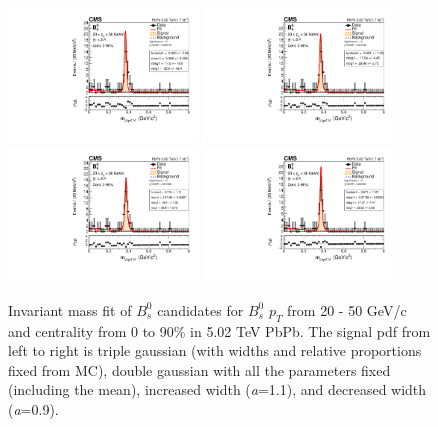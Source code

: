\begin{figure}[hbtp]
\begin{center}
\includegraphics[width=0.45\textwidth]{Figures/Chapter5/data_PbPb_1_BptNew_2050_doubly0_0_90_signal_3gaussEffInfoTreeFit.pdf}
\includegraphics[width=0.45\textwidth]{Figures/Chapter5/data_PbPb_1_BptNew_2050_doubly0_0_90_signal_fixedEffInfoTreeFit.pdf}
\includegraphics[width=0.45\textwidth]{Figures/Chapter5/data_PbPb_1_BptNew_2050_doubly0_0_90_signal_scal+EffInfoTreeFit.pdf}
\includegraphics[width=0.45\textwidth]{Figures/Chapter5/data_PbPb_1_BptNew_2050_doubly0_0_90_signal_scal-EffInfoTreeFit.pdf}
\caption{Invariant mass fit of $B^0_s$ candidates for $B^0_s$ $p_T$ from 20 - 50 GeV/c and centrality from 0 to 90\% in 5.02 TeV PbPb. The signal pdf from left to right is triple gaussian (with widths and relative proportions fixed from MC), double gaussian with all the parameters fixed (including the mean), increased width (\textit{a}=1.1), and decreased width (\textit{a}=0.9).}
\label{BsSigVar}
\end{center}
\end{figure}



